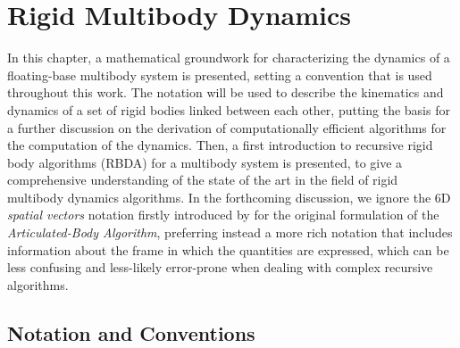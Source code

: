 \chapter{Rigid Multibody Dynamics}
\label{chp:back_RBDynamics}

In this chapter, a mathematical groundwork for characterizing the dynamics of a floating-base multibody system is presented, setting a convention that is used throughout this work. The notation will be used to describe the kinematics and dynamics of a set of rigid bodies linked between each other, putting the basis for a further discussion on the derivation of computationally efficient algorithms for the computation of the dynamics. Then, a first introduction to recursive rigid body algorithms (\ac{RBDA}) for a multibody system is presented, to give a comprehensive understanding of the state of the art in the field of rigid multibody dynamics algorithms. In the forthcoming discussion, we ignore the 6D \textit{spatial vectors} notation firstly introduced by \citet{featherstone_rigid_2008} for the original formulation of the \textit{Articulated-Body Algorithm}, preferring instead a more rich notation that includes information about the frame in which the quantities are expressed, which can be less confusing and less-likely error-prone when dealing with complex recursive algorithms.

\section{Notation and Conventions}

